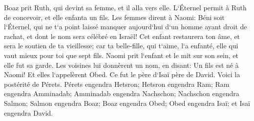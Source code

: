 \verse Boaz prit Ruth, qui devint sa femme, et il alla vers elle. L`Éternel permit à Ruth de concevoir, et elle enfanta un fils. 
\verse Les femmes dirent à Naomi: Béni soit l`Éternel, qui ne t`a point laissé manquer aujourd`hui d`un homme ayant droit de rachat, et dont le nom sera célébré en Israël! 
\verse Cet enfant restaurera ton âme, et sera le soutien de ta vieillesse; car ta belle-fille, qui t`aime, l`a enfanté, elle qui vaut mieux pour toi que sept fils. 
\verse Naomi prit l`enfant et le mit sur son sein, et elle fut sa garde. 
\verse Les voisines lui donnèrent un nom, en disant: Un fils est né à Naomi! Et elles l`appelèrent Obed. Ce fut le père d`Isaï père de David. 
\verse Voici la postérité de Pérets. 
\verse Pérets engendra Hetsron; Hetsron engendra Ram; Ram engendra Amminadab; 
\verse Amminadab engendra Nachschon; Nachschon engendra Salmon; 
\verse Salmon engendra Boaz; Boaz engendra Obed; 
\verse Obed engendra Isaï; et Isaï engendra David. 

